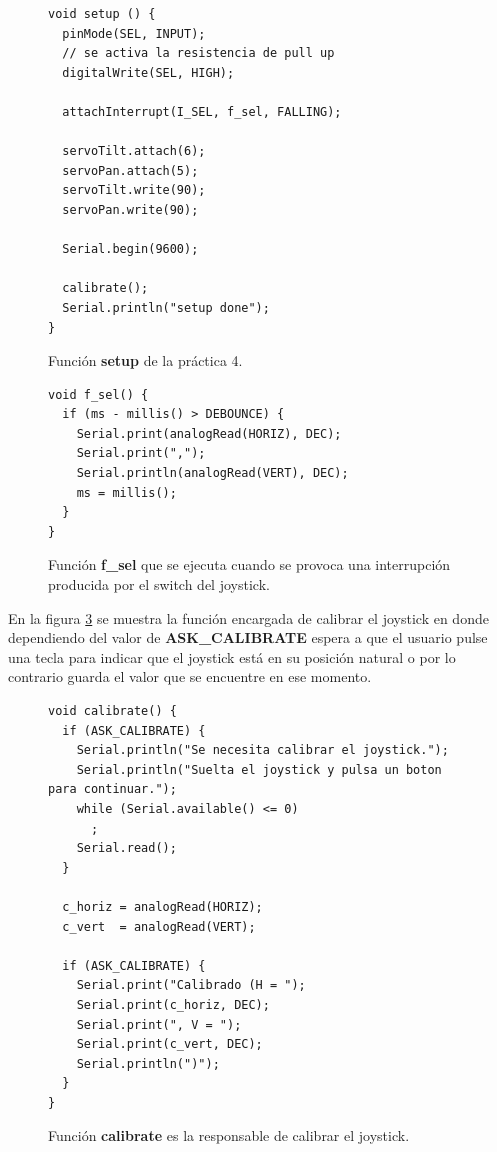 \documentclass{article}
\begin{document}
\begin{figure}[h]
	\begin{lstlisting}[style=c]
void setup () {
  pinMode(SEL, INPUT);
  // se activa la resistencia de pull up
  digitalWrite(SEL, HIGH);
  
  attachInterrupt(I_SEL, f_sel, FALLING);
  
  servoTilt.attach(6);
  servoPan.attach(5);
  servoTilt.write(90);
  servoPan.write(90);
  
  Serial.begin(9600);
  
  calibrate();
  Serial.println("setup done");
}
	\end{lstlisting}
	\caption{Función \textbf{setup} de la práctica 4.}
	\label{cod:p4:setup}
\end{figure}

\begin{figure}[h]
	\begin{lstlisting}[style=c]
void f_sel() {
  if (ms - millis() > DEBOUNCE) {
    Serial.print(analogRead(HORIZ), DEC);
    Serial.print(",");
    Serial.println(analogRead(VERT), DEC); 
    ms = millis();
  } 
}
	\end{lstlisting}
	\caption{Función \textbf{f\_sel} que se ejecuta cuando se provoca una interrupción producida por el switch del joystick.}
	\label{cod:p4:f_sel}
\end{figure}

	En la figura \ref{cod:p4:calibrate} se muestra la función encargada de calibrar el joystick en donde dependiendo del valor de \textbf{ASK\_CALIBRATE} espera a que el usuario pulse una tecla para indicar que el joystick está en su posición natural o por lo contrario guarda el valor que se encuentre en ese momento.

\begin{figure}[h]
	\begin{lstlisting}[style=c]
void calibrate() {
  if (ASK_CALIBRATE) {
    Serial.println("Se necesita calibrar el joystick.");
    Serial.println("Suelta el joystick y pulsa un boton para continuar.");
    while (Serial.available() <= 0)
      ;
    Serial.read();
  }
  
  c_horiz = analogRead(HORIZ);
  c_vert  = analogRead(VERT);
  
  if (ASK_CALIBRATE) {
    Serial.print("Calibrado (H = ");
    Serial.print(c_horiz, DEC);
    Serial.print(", V = ");
    Serial.print(c_vert, DEC);
    Serial.println(")");
  }
}
	\end{lstlisting}
	\caption{Función \textbf{calibrate} es la responsable de calibrar el joystick.}
	\label{cod:p4:calibrate}
\end{figure}
\end{document}

